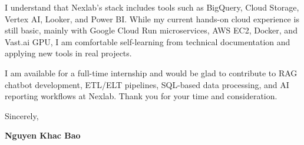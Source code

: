 \documentclass[11pt,a4paper]{article}
\begin{document}
I understand that Nexlab's stack includes tools such as BigQuery, Cloud Storage, Vertex AI, Looker, and Power BI. While my current hands-on cloud experience is still basic, mainly with Google Cloud Run microservices, AWS EC2, Docker, and Vast.ai GPU, I am comfortable self-learning from technical documentation and applying new tools in real projects.

I am available for a full-time internship and would be glad to contribute to RAG chatbot development, ETL/ELT pipelines, SQL-based data processing, and AI reporting workflows at Nexlab. Thank you for your time and consideration.

\vspace{10pt}

Sincerely,

\vspace{16pt}

\textbf{Nguyen Khac Bao}
\end{document}
